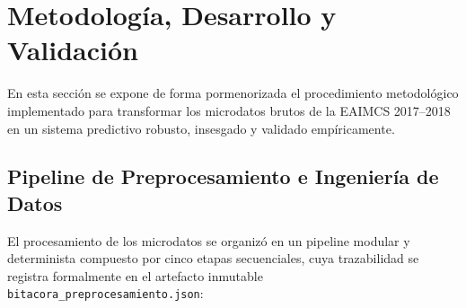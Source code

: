 \section{Metodología, Desarrollo y Validación}
\label{sec:metodologia}

En esta sección se expone de forma pormenorizada el procedimiento metodológico implementado para transformar los microdatos brutos de la EAIMCS 2017--2018 en un sistema predictivo robusto, insesgado y validado empíricamente.

\subsection{Pipeline de Preprocesamiento e Ingeniería de Datos}
El procesamiento de los microdatos se organizó en un pipeline modular y determinista compuesto por cinco etapas secuenciales, cuya trazabilidad se registra formalmente en el artefacto inmutable \texttt{bitacora\_preprocesamiento.json}:

